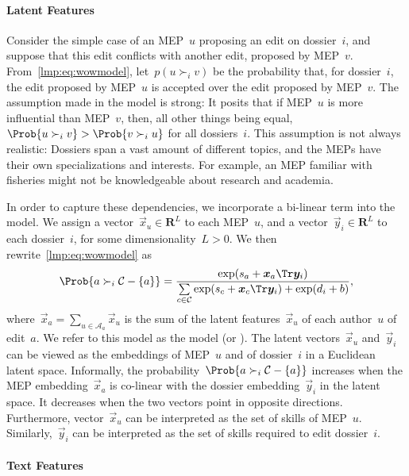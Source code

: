 \paragraph{Latent Features}

Consider the simple case of an MEP~$u$ proposing an edit on dossier~$i$, and suppose that this edit conflicts with another edit, proposed by MEP~$v$.
From~\eqref{lmp:eq:wowmodel}, let~$p( u \succ_i v)$ be the probability that, for dossier~$i$, the edit proposed by MEP~$u$ is accepted over the edit proposed by MEP~$v$.
The assumption made in the \wow{} model is strong:
It posits that if MEP~$u$ is more influential than MEP~$v$, then, all other things being equal,~$\Prob{u \succ_i v} > \Prob{v \succ_i u}$ for all dossiers~$i$.
This assumption is not always realistic:
Dossiers span a vast amount of different topics, and the MEPs have their own specializations and interests.
For example, an MEP familiar with fisheries might not be knowledgeable about research and academia.

In order to capture these dependencies, we incorporate a bi-linear term into the \wow{} model.
We assign a vector~$\vec{x}_u \in \mathbf{R}^L$ to each MEP~$u$, and a vector~$\vec{y}_i \in \mathbf{R}^L$ to each dossier~$i$, for some dimensionality~$L > 0$.
We then rewrite~\eqref{lmp:eq:wowmodel} as
\begin{equation}
	\label{lmp:eq:wowlatent}
	\Prob{ a \succ_i \mathcal{C} - \{ a\} } =
	\frac{\exp( s_a + \vec{x}_a\Tr \vec{y}_i) }{ \sum\limits_{c \in \mathcal{C} } \exp(s_c + \vec{x}_c\Tr \vec{y}_i) + \exp(d_i + b) },
\end{equation}
where~$\vec{x}_a = \sum_{u \in \mathcal{A}_a} \vec{x}_u$ is the sum of the latent features~$\vec{x}_u$ of each author~$u$ of edit~$a$.
We refer to this model as the  model (or ).
The latent vectors~$\vec{x}_u$ and~$\vec{y}_i$ can be viewed as the embeddings of MEP~$u$ and of dossier~$i$ in a Euclidean latent space.
Informally, the probability~$\Prob{ a \succ_i \mathcal{C} - \{ a\} }$ increases when the MEP embedding~$ \vec{x}_a$ is co-linear with the dossier embedding~$ \vec{y}_i$ in the latent space.
It decreases when the two vectors point in opposite directions.
Furthermore, vector~$ \vec{x}_u$ can be interpreted as the set of skills of MEP~$u$.
Similarly,~$ \vec{y}_i$ can be interpreted as the set of skills required to edit dossier~$i$.

\paragraph{Text Features}

